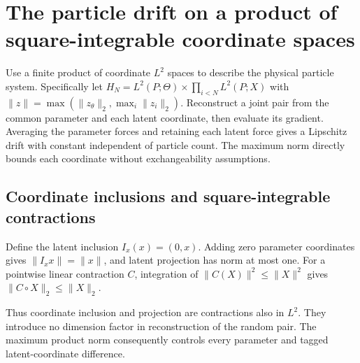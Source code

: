 \documentclass[11pt,a4paper]{report}
\begin{document}
\section{\texorpdfstring{The particle drift on a product of square-integrable coordinate spaces}{The particle drift on a product of square-integrable coordinate spaces}}
\label{proof-module-ProximalLangevin-MeanFieldParticleDrift-lean}


Use a finite product of coordinate \(L^2\) spaces to describe the physical particle system. Specifically let \(H_N=L^2(P;\Theta)\times\prod_{i<N}L^2(P;X)\) with \(\|z\|=\max(\|z_\theta\|_2,\max_i\|z_i\|_2)\). Reconstruct a joint pair from the common parameter and each latent coordinate, then evaluate its gradient. Averaging the parameter forces and retaining each latent force gives a Lipschitz drift with constant independent of particle count. The maximum norm directly bounds each coordinate without exchangeability assumptions.

\subsection{\texorpdfstring{Coordinate inclusions and square-integrable contractions}{Coordinate inclusions and square-integrable contractions}}
\label{report-step-ProximalLangevin-MeanFieldParticleDrift-lean-1}


Define the latent inclusion \(I_x(x)=(0,x)\). Adding zero parameter coordinates gives \(\|I_xx\|=\|x\|\), and latent projection has norm at most one. For a pointwise linear contraction \(C\), integration of \(\|C(X)\|^2\le\|X\|^2\) gives \(\|C\circ X\|_2\le\|X\|_2\).



Thus coordinate inclusion and projection are contractions also in \(L^2\). They introduce no dimension factor in reconstruction of the random pair. The maximum product norm consequently controls every parameter and tagged latent-coordinate difference.
\end{document}
